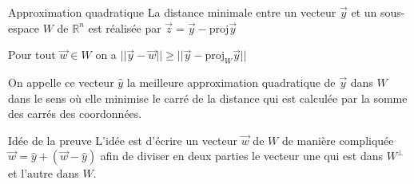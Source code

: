 \begin{parag}{Approximation quadratique}
    La distance minimale entre un vecteur $\vec{y}$ et un sous-espace $W$ de $\mathbb{R}^n$ est réalisée par $\vec{z} = \vec{y} - \text{proj}\vec{y}$
    \begin{theoreme}
        Pour tout $\vec{w} \in W$ on a $||\vec{y} - \vec{w}|| \geq ||\vec{y} - \text{proj}_W\vec{y}||$
    \end{theoreme}
    On appelle ce vecteur $\hat{y}$ la meilleure approximation quadratique de $\vec{y}$ dans $W$ dans le sens où elle minimise le carré de la distance qui est calculée par la somme des carrés des coordonnées.
    \begin{subparag}{Idée de la preuve}
            L'idée est d'écrire un vecteur $\vec{w}$ de $W$ de manière compliquée $\vec{w} = \hat{y} + (\vec{w} - \hat{y})$ afin de diviser en deux parties le vecteur une qui est dans $W^\perp$ et l'autre dans $W$.
    \end{subparag}
\end{parag}

